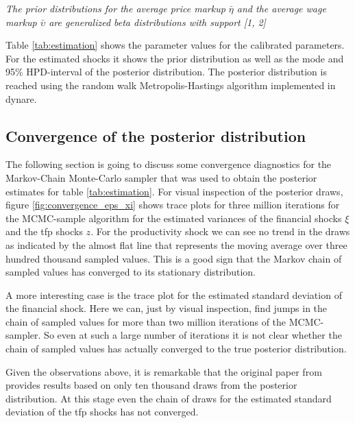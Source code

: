 \begin{table}
  \centering
  \caption{Parameterization}
  \label{tab:estimation}
  \smallskip

  \raggedright
  {\footnotesize \textit{The prior distributions for the average price
    markup $\bar{\eta}$ and the average wage markup $\bar{\upsilon}$ are generalized
    beta distributions with support [1, 2] }}
\end{table}

Table \ref{tab:estimation} shows the parameter values for the calibrated
parameters. For the estimated shocks it shows the prior distribution as well as
the mode and 95\% HPD-interval of the posterior distribution. The posterior
distribution is reached using the random walk Metropolis-Hastings algorithm
implemented in dynare.

\subsection{Convergence of the posterior distribution}
\label{sec:convergence}

The following section is going to discuss some convergence diagnostics for the
Markov-Chain Monte-Carlo sampler that was used to obtain the posterior
estimates for table \ref{tab:estimation}. For visual inspection of the
posterior draws, figure \ref{fig:convergence_eps_xi} shows trace plots for three
million iterations for the MCMC-sample algorithm for the estimated variances of the
financial shocks \(\xi\) and the tfp shocks \(z\). For the productivity shock
we can see no trend in the draws as indicated by the almost flat line that
represents the moving average over three hundred thousand sampled values. This
is a good sign that the Markov chain of sampled values has converged to its
stationary distribution.

A more interesting case is the trace plot for the estimated standard deviation
of the financial shock. Here we can, just by visual inspection, find jumps in
the chain of sampled values for more than two million iterations of the
MCMC-sampler. So even at such a large number of iterations it is not clear
whether the chain of sampled values has actually converged to the true
posterior distribution. 

Given the observations above, it is remarkable that the original paper from
\textcite{jerman_macroeconomic_2012} provides results based on only ten
thousand draws from the posterior distribution. At this stage even the chain of
draws for the estimated standard deviation of the tfp shocks has not converged.
